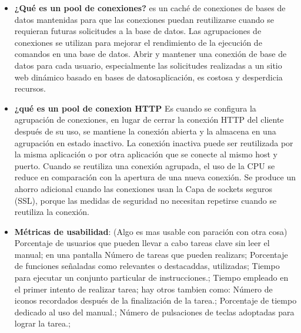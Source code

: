 \begin{itemize}
\item \textbf{¿Qué es un pool de conexiones?} es un caché de conexiones de bases de datos mantenidas para que las conexiones puedan reutilizarse cuando se requieran futuras solicitudes a la base de datos. Las agrupaciones de conexiones se utilizan para mejorar el rendimiento de la ejecución de comandos en una base de datos. Abrir y mantener una conexión de base de datos para cada usuario, especialmente las solicitudes realizadas a un sitio web dinámico basado en bases de datosaplicación, es costosa y desperdicia recursos.
\item \textbf{¿qué es un pool de conexion HTTP} Es cuando se configura la agrupación de conexiones, en lugar de cerrar la conexión HTTP del cliente después de su uso, se mantiene la conexión abierta y la almacena en una agrupación en estado inactivo. La conexión inactiva puede ser reutilizada por la misma aplicación o por otra aplicación que se conecte al mismo host y puerto. Cuando se reutiliza una conexión agrupada, el uso de la CPU se reduce en comparación con la apertura de una nueva conexión. Se produce un ahorro adicional cuando las conexiones usan la Capa de sockets seguros (SSL), porque las medidas de seguridad no necesitan repetirse cuando se reutiliza la conexión.
\item \textbf{Métricas de usabilidad}: (Algo es mas usable con paración con otra cosa) Porcentaje de usuarios que pueden llevar a cabo tareas clave sin leer el manual; en una pantalla  Número de tareas que pueden realizars;  Porcentaje de funciones señaladas como relevantes o destacaddas,  utilizadas; Tiempo para ejecutar un conjunto particular de instrucciones.; Tiempo empleado en el primer intento de realizar tarea;  hay otros tambien como: Número de iconos recordados después de la finalización de la tarea.; Porcentaje de tiempo dedicado al uso del manual.; Número de pulsaciones de teclas adoptadas para lograr la tarea.;
 \end{itemize}


